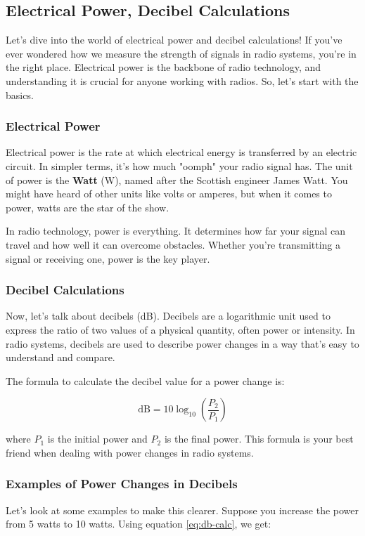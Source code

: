 \subsection{Electrical Power, Decibel Calculations}
\label{subsec:power-db}

Let's dive into the world of electrical power and decibel calculations! If you've ever wondered how we measure the strength of signals in radio systems, you're in the right place. Electrical power is the backbone of radio technology, and understanding it is crucial for anyone working with radios. So, let's start with the basics.

\subsubsection*{Electrical Power}
Electrical power is the rate at which electrical energy is transferred by an electric circuit. In simpler terms, it's how much "oomph" your radio signal has. The unit of power is the \textbf{Watt} (W), named after the Scottish engineer James Watt. You might have heard of other units like volts or amperes, but when it comes to power, watts are the star of the show. 

In radio technology, power is everything. It determines how far your signal can travel and how well it can overcome obstacles. Whether you're transmitting a signal or receiving one, power is the key player.

\subsubsection*{Decibel Calculations}
Now, let's talk about decibels (dB). Decibels are a logarithmic unit used to express the ratio of two values of a physical quantity, often power or intensity. In radio systems, decibels are used to describe power changes in a way that's easy to understand and compare.

The formula to calculate the decibel value for a power change is:

\begin{equation}
\text{dB} = 10 \log_{10}\left(\frac{P_2}{P_1}\right)
\label{eq:db-calc}
\end{equation}

where \(P_1\) is the initial power and \(P_2\) is the final power. This formula is your best friend when dealing with power changes in radio systems.

\subsubsection*{Examples of Power Changes in Decibels}
Let's look at some examples to make this clearer. Suppose you increase the power from 5 watts to 10 watts. Using equation \ref{eq:db-calc}, we get:

